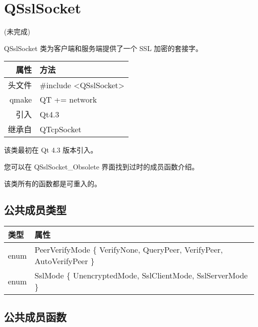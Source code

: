 \chapter{QSslSocket} (未完成)

QSslSocket 类为客户端和服务端提供了一个 SSL 加密的套接字。

\begin{tabular}{|r|l|}
	\hline
	属性 & 方法 \\
	\hline
	头文件 & \#include <QSslSocket>\\      
	\hline
	qmake & QT += network\\      
	\hline
	引入 &	Qt4.3 \\ 
	\hline
	继承自 	& QTcpSocket \\
	\hline
\end{tabular}

该类最初在 Qt 4.3 版本引入。

您可以在 QSslSocket\_Obsolete 界面找到过时的成员函数介绍。

\begin{notice}
该类所有的函数都是可重入的。
\end{notice}

\section{公共成员类型}

\begin{tabular}[l]{|l|m{30em}|}
\hline 
类型 &	属性\\ 
\hline 
enum 	&PeerVerifyMode \{ VerifyNone, QueryPeer, VerifyPeer, AutoVerifyPeer \} \\ 
\hline  
enum &	SslMode \{ UnencryptedMode, SslClientMode, SslServerMode \} \\ 
	\hline
\end{tabular}


\section{公共成员函数}

